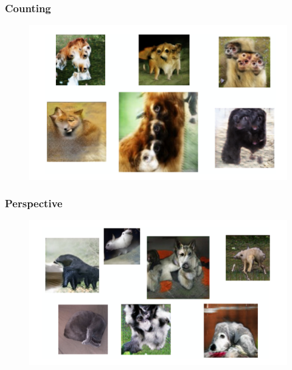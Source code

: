 \documentclass{Bredelebeamer}
\begin{document}
\begin{frame} \frametitle{Counting}
	\begin{figure}[h!]
	\centering
	\includegraphics[width=\textwidth]{gan_counting_problem.png}
	\end{figure}
\end{frame}

\begin{frame} \frametitle{Perspective}
	\begin{figure}[h!]
	\centering
	\includegraphics[width=\textwidth]{gan_perspective_problem.png}
	\end{figure}
\end{frame}
\end{document}
